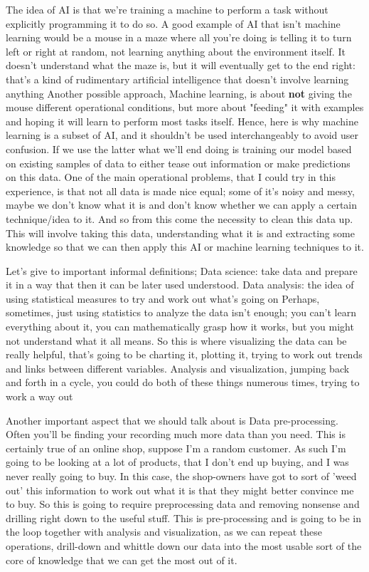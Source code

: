 The idea of AI is that we're training a machine to perform a task without explicitly programming it to do so. 
A good example of AI that isn't machine learning would be a mouse in a maze where all you're doing is telling 
it to turn left or right at random, not learning anything about the environment itself.
It doesn't understand what the maze is, but it will eventually get to the end right: that's a kind of rudimentary artificial intelligence
that doesn't involve learning anything
Another possible approach, Machine learning, is about \textbf{not} giving the mouse different operational conditions, but more about "feeding" it 
with examples and hoping it will learn to perform most tasks itself.
Hence, here is why machine learning is a subset of AI, and it shouldn't be used interchangeably to avoid user confusion.
If we use the latter what we'll end doing is training our model based on existing samples of data to either tease out information or make predictions on this data.
One of the main operational problems, that I could try in this experience, is that not all data is made nice equal; 
some of it's noisy and messy, maybe we don't know what it is and don't know whether we can apply a certain technique/idea to it.
And so from this come the necessity to clean this data up. This will involve taking this data, understanding what it is and extracting some knowledge 
so that we can then apply this AI or machine learning techniques to it.

Let's give to important informal definitions; Data science: take data and prepare it in a way that then it can be later used understood.
Data analysis: the idea of using statistical measures to try and work out what's going on
Perhaps, sometimes, just using statistics to analyze the data isn't enough; you can't learn everything about it, you can mathematically grasp how it works, but you might not understand what it all means.
So this is where visualizing the data can be really helpful, that's going to be charting it, plotting it, 
trying to work out trends and links between different variables. 
Analysis and visualization, jumping back and forth in a cycle, you could do both of these things numerous times, trying to work a way out

Another important aspect that we should talk about is Data pre-processing.
Often you'll be finding your recording much more data than you need. This is certainly true of an online shop, 
suppose I'm a random customer. As such I'm going to be looking at a lot of products, that I don't end up buying, and I was never really going to buy. 
In this case, the shop-owners have got to sort of 'weed out' this information to work out what it is that they might better convince me to buy.
So this is going to require preprocessing data and removing nonsense and drilling right down to the useful stuff.
This is pre-processing and is going to be in the loop together with analysis and visualization, as we can repeat these operations, 
drill-down and whittle down our data into the most usable sort of the core of knowledge that we can get the most out of it.

